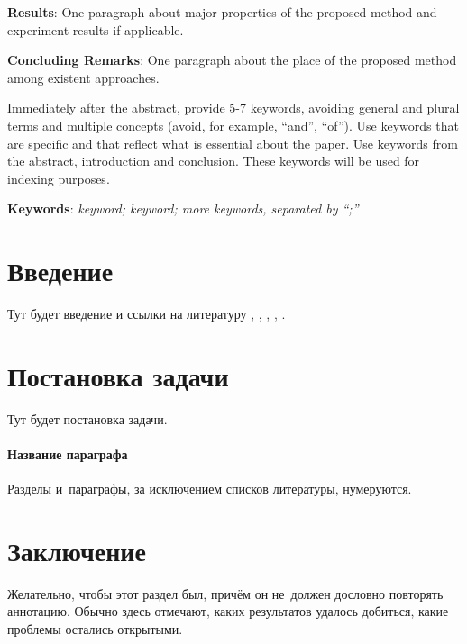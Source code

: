 \documentclass[12pt, twoside]{article}
\begin{document}
{	\noindent
	\textbf{Results}: One paragraph about major properties of the proposed method and experiment results if applicable.
	
	\noindent
	\textbf{Concluding Remarks}: One paragraph about the place of the proposed method among existent approaches.
		
	\noindent
	Immediately after the abstract, provide 5-7 keywords, avoiding general and plural terms and multiple concepts (avoid, for example, ``and'', ``of'').
	Use keywords that are specific and that reflect what is essential about the paper.
	Use keywords from the abstract, introduction and conclusion.
	These keywords will be used for indexing purposes.
		
	\noindent
    	\textbf{Keywords}: \emph{keyword; keyword; more keywords, separated by ``;''}}


\maketitle

\section{Введение}
Тут будет введение и ссылки на литературу \cite{vorontsov_co/survey-artm},
\cite{vorontsov_co/non-bayesian-armt}, \cite{yanina/multiobjective-topic-modeling},
\cite{vorontsov_co/topic-selection-artm}, \cite{conf/slds/VorontsovPP15}.

\section{Постановка задачи}
Тут будет постановка задачи.

\paragraph{Название параграфа}
Разделы и~параграфы, за исключением списков литературы, нумеруются.

\section{Заключение}
Желательно, чтобы этот раздел был, причём он не~должен дословно повторять аннотацию.
Обычно здесь отмечают, каких результатов удалось добиться, какие проблемы остались открытыми.



\end{document}
